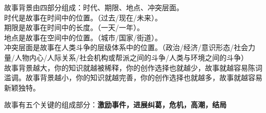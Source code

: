 \documentclass[UTF8,9pt]{ctexart}
\begin{document}
\begin{itemize}
    故事背景由四部分组成：时代、期限、地点、冲突层面。\\
    时代是故事在时间中的位置。（过去/现在/未来）。\\
    期限是故事在时间中的长度。（一天/一年）。\\
    地点是故事在空间中的位置。（城市/国家/街道）。\\
    冲突层面是故事在人类斗争的层级体系中的位置。（政治/经济/意识形态/社会力量/人物内心/人际关系/社会机构或帮派之间的斗争/人类与环境之间的斗争）\\
    故事背景越大，你的知识就越被稀释，你的创作选择也就越少，故事就越容易陈词滥调。故事背景越小，你的知识就越完善，你的创作选择也就越多，故事就越容易新颖独特。


\end{itemize}
故事有五个关键的组成部分：{\bf 激励事件，进展纠葛，危机，高潮，结局}
\end{document}
